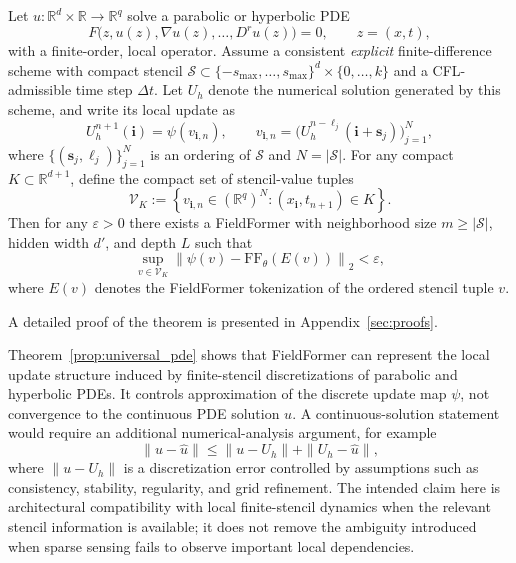 \begin{theorem}
\label{prop:universal_pde}
Let $u:\mathbb{R}^{d}\times\mathbb{R}\to\mathbb{R}^q$ solve a parabolic or hyperbolic PDE
\[
F\bigl(z,u(z),\nabla u(z),\ldots,D^r u(z)\bigr)=0,\qquad z=(x,t),
\]
with a finite-order, local operator. Assume a consistent \emph{explicit} finite-difference scheme
with compact stencil $\mathcal{S}\subset\{-s_{\max},\ldots,s_{\max}\}^d\times\{0,\ldots,k\}$ and a
CFL-admissible time step $\Delta t$. Let $U_h$ denote the numerical solution generated by this scheme, and write its local update as
\[
U_h^{n+1}(\mathbf{i})=\psi(v_{\mathbf{i},n}),\qquad
v_{\mathbf{i},n}
=
\bigl(U_h^{n-\ell_j}(\mathbf{i}+\mathbf{s}_j)\bigr)_{j=1}^{N},
\]
where $\{(\mathbf{s}_j,\ell_j)\}_{j=1}^{N}$ is an ordering of $\mathcal{S}$ and $N=|\mathcal{S}|$. For any compact $K\subset\mathbb{R}^{d+1}$, define the compact set of stencil-value tuples
\[
\mathcal{V}_K
:=
\left\{
v_{\mathbf{i},n}\in(\mathbb{R}^{q})^{N}
:
(x_{\mathbf{i}},t_{n+1})\in K
\right\}.
\]
Then for any $\varepsilon>0$ there exists a FieldFormer with neighborhood size $m\ge|\mathcal{S}|$, hidden width $d'$, and depth $L$ such that
\[
\sup_{v\in\mathcal{V}_K}
\left\|
\psi(v)-\mathrm{FF}_{\theta}(E(v))
\right\|_2
<\varepsilon,
\]
where $E(v)$ denotes the FieldFormer tokenization of the ordered stencil tuple $v$.
\end{theorem}

A detailed proof of the theorem is presented in Appendix~\ref{sec:proofs}.

\begin{remark}
Theorem~\ref{prop:universal_pde} shows that FieldFormer can represent the local update structure induced by finite-stencil discretizations of parabolic and hyperbolic PDEs. It controls approximation of the discrete update map $\psi$, not convergence to the continuous PDE solution $u$. A continuous-solution statement would require an additional numerical-analysis argument, for example
\[
\|u-\hat u\|
\le
\|u-U_h\|
+
\|U_h-\hat u\|,
\]
where $\|u-U_h\|$ is a discretization error controlled by assumptions such as consistency, stability, regularity, and grid refinement. The intended claim here is architectural compatibility with local finite-stencil dynamics when the relevant stencil information is available; it does not remove the ambiguity introduced when sparse sensing fails to observe important local dependencies.
\end{remark}

